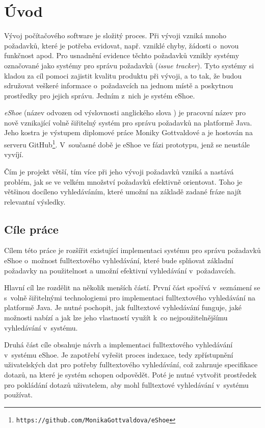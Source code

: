 \documentclass[11pt,oneside]{fithesis2}
\begin{document}
\chapter{Úvod}
\label{UvodChapter}
Vývoj počítačového software je složitý proces. Při vývoji vzniká mnoho požadavků, které je potřeba evidovat, např. vzniklé chyby, žádosti o~novou funkčnost apod. Pro usnadnění evidence těchto požadavků vznikly systémy označované jako systémy pro správu požadavků (\emph{issue tracker}). Tyto systémy si kladou za cíl pomoci zajistit kvalitu produktu při vývoji, a to tak, že budou sdružovat veškeré informace o~požadavcích na jednom místě a poskytnou prostředky pro jejich správu.  Jedním z~nich je systém eShoe.

\emph{eShoe} (název odvozen od výslovnosti anglického slova \emph{}) je pracovní název pro nově vznikající volně šiřitelný systém pro správu požadavků na platformě Java. Jeho kostra je výstupem diplomové práce Moniky Gottvaldové \cite{eShoeDiplomka} a je hostován na serveru GitHub\footnote{\texttt{https://github.com/MonikaGottvaldova/eShoe}}. V~současné době je eShoe ve fázi prototypu, jenž se neustále vyvíjí. 

Čím je projekt větší, tím více při jeho vývoji požadavků vzniká a nastává problém, jak se ve velkém množství požadavků efektivně orientovat. Toho je většinou docíleno vyhledáváním, které umožní na základě zadané fráze najít relevantní výsledky. 

\section{Cíle práce}
\label{CilePrace}
Cílem této práce je rozšířit existující implementaci systému pro správu požadavků eShoe o~možnost fulltextového vyhledávání, které bude splňovat základní požadavky na použitelnost a umožní efektivní vyhledávání v~požadavcích. 

Hlavní cíl lze rozdělit na několik menších částí. První část spočívá v~seznámení se s~volně šiřitelnými technologiemi pro implementaci fulltextového vyhledávání na platformě Java. Je nutné pochopit, jak fulltextové vyhledávání funguje, jaké možnosti nabízí a jak lze jeho vlastností využít k~co nejpoužitelnějšímu vyhledávání v~systému.

Druhá část cíle obsahuje návrh a implementaci fulltextového vyhledávání v~systému eShoe. Je zapotřebí vyřešit proces indexace, tedy zpřístupnění uživatelských dat pro potřeby fulltextového vyhledávání, což zahrnuje specifikace dotazů, na které je systém schopen odpovědět. Poté je nutné vytvořit prostředek pro pokládání dotazů uživatelem, aby mohl fulltextové vyhledávání v~systému používat.
\end{document}
